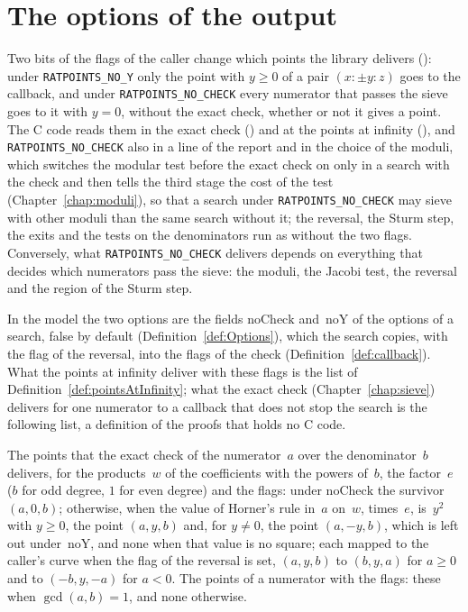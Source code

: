 \section{The options of the output}\label{sec:outputFlags}

Two bits of the flags of the caller change which points the library delivers
(): under \verb|RATPOINTS_NO_Y| only the point with $y \ge 0$ of a
pair $(x : \pm y : z)$ goes to the callback, and under \verb|RATPOINTS_NO_CHECK| every numerator
that passes the sieve goes to it with $y = 0$, without the exact check, whether or not it gives a
point. The C code reads them in the exact check () and at the
points at infinity (), and \verb|RATPOINTS_NO_CHECK| also in a
line of the report and in the choice of the moduli, which switches the modular test before the exact
check on only in a search with the check and then tells the third stage the cost of the test
(Chapter~\ref{chap:moduli}), so that a search under \verb|RATPOINTS_NO_CHECK| may sieve with other
moduli than the same search without it; the reversal, the Sturm step, the exits and the tests on the
denominators run as without the two flags. Conversely, what \verb|RATPOINTS_NO_CHECK| delivers
depends on everything that decides which numerators pass the sieve: the moduli, the Jacobi test, the
reversal and the region of the Sturm step.

In the model the two options are the fields $\mathrm{noCheck}$ and~$\mathrm{noY}$ of the options of
a search, false by default (Definition~\ref{def:Options}), which the search copies, with the flag of
the reversal, into the flags of the check (Definition~\ref{def:callback}). What the points at
infinity deliver with these flags is the list of Definition~\ref{def:pointsAtInfinity}; what the
exact check (Chapter~\ref{chap:sieve}) delivers for one numerator to a callback that does not stop
the search is the following list, a definition of the proofs that holds no C code.

\begin{definition}\label{def:checkNumWith}
  \leanok
  The points that the exact check of the numerator~$a$ over the denominator~$b$ delivers, for the
  products~$w$ of the coefficients with the powers of~$b$, the factor~$e$ ($b$ for odd degree, $1$
  for even degree) and the flags: under $\mathrm{noCheck}$ the survivor $(a, 0, b)$; otherwise,
  when the value of Horner's rule in~$a$ on~$w$, times~$e$, is~$y^2$ with $y \ge 0$, the point
  $(a, y, b)$ and, for $y \ne 0$, the point $(a, -y, b)$, which is left out under~$\mathrm{noY}$,
  and none when that value is no square; each mapped to the caller's curve when the flag of the
  reversal is set, $(a, y, b)$ to $(b, y, a)$ for $a \ge 0$ and to $(-b, y, -a)$ for $a < 0$. The
  points of a numerator with the flags: these when $\gcd(a, b) = 1$, and none otherwise.
\end{definition}

